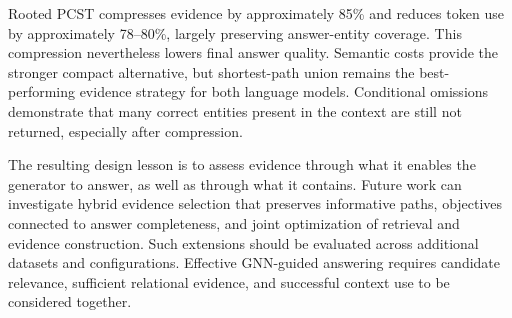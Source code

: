 \documentclass[10pt]{article}
\begin{document}
Rooted PCST compresses evidence by approximately 85\% and reduces token use by approximately 78--80\%, largely preserving answer-entity coverage. This compression nevertheless lowers final answer quality. Semantic costs provide the stronger compact alternative, but shortest-path union remains the best-performing evidence strategy for both language models. Conditional omissions demonstrate that many correct entities present in the context are still not returned, especially after compression.

The resulting design lesson is to assess evidence through what it enables the generator to answer, as well as through what it contains. Future work can investigate hybrid evidence selection that preserves informative paths, objectives connected to answer completeness, and joint optimization of retrieval and evidence construction. Such extensions should be evaluated across additional datasets and configurations. Effective GNN-guided answering requires candidate relevance, sufficient relational evidence, and successful context use to be considered together.




\clearpage
\appendix

\end{document}

